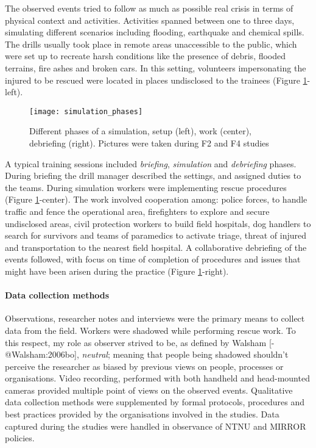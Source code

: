 The observed events tried to follow as much as possible real crisis in
terms of physical context and activities. Activities spanned between one
to three days, simulating different scenarios including flooding,
earthquake and chemical spills. The drills usually took place in remote
areas unaccessible to the public, which were set up to recreate harsh
conditions like the presence of debris, flooded terrains, fire ashes and
broken cars. In this setting, volunteers impersonating the injured to be
rescued were located in places undisclosed to the trainees (Figure
\ref{fig:simulation-phases}-left).

\begin{figure}[tbh]
    \centering
    \texttt{[image: simulation\_phases]}
    \caption{Different phases of a simulation, setup (left), work (center), debriefing (right). Pictures were taken during F2 and F4 studies}
    \label{fig:simulation-phases}
\end{figure}

A typical training sessions included \emph{briefing}, \emph{simulation}
and \emph{debriefing} phases. During briefing the drill manager
described the settings, and assigned duties to the teams. During
simulation workers were implementing rescue procedures (Figure
\ref{fig:simulation-phases}-center). The work involved cooperation
among: police forces, to handle traffic and fence the operational area,
firefighters to explore and secure undisclosed areas, civil protection
workers to build field hospitals, dog handlers to search for survivors
and teams of paramedics to activate triage, threat of injured and
transportation to the nearest field hospital. A collaborative debriefing
of the events followed, with focus on time of completion of procedures
and issues that might have been arisen during the practice (Figure
\ref{fig:simulation-phases}-right).

\paragraph{Data collection methods}\label{data-collection-methods}

Observations, researcher notes and interviews were the primary means to
collect data from the field. Workers were shadowed while performing
rescue work. To this respect, my role as observer strived to be, as
defined by Walsham {[}-@Walsham:2006bo{]}, \emph{neutral}; meaning that
people being shadowed shouldn't perceive the researcher as biased by
previous views on people, processes or organisations. Video recording,
performed with both handheld and head-mounted cameras provided multiple
point of views on the observed events. Qualitative data collection
methods were supplemented by formal protocols, procedures and best
practices provided by the organisations involved in the studies. Data
captured during the studies were handled in observance of NTNU and
MIRROR policies.

